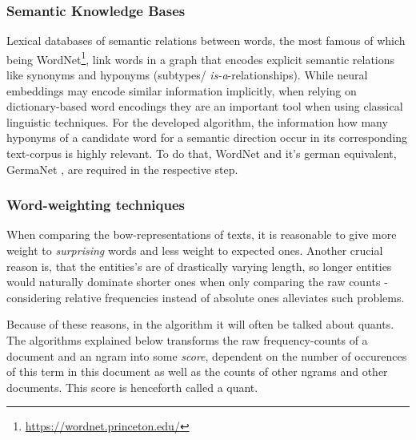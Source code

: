 \subsubsection*{Semantic Knowledge Bases}

Lexical databases of semantic relations between words, the most famous of which being WordNet\footnote{\url{https://wordnet.princeton.edu/}}, link words in a graph that encodes explicit semantic relations like synonyms and hyponyms (subtypes/ \emph{is-a}-relationships). While neural %
embeddings may encode similar information implicitly, when relying on dictionary-based word encodings they are an important tool when using classical linguistic techniques. For the developed algorithm, the information how many hyponyms of a candidate word for a semantic direction %
occur in its corresponding text-corpus is highly relevant. To do that, WordNet \cite{Miller1995} and it's german equivalent, GermaNet \cite{hamp-feldweg-1997-germanet,Henrich}, are required in the respective step.


\subsubsection*{Word-weighting techniques}

\label{sec:word_count_techniques}

When comparing the \gls{bow}-representations of texts, it is reasonable to give more weight to \emph{surprising} words and less weight to expected ones.  \cite[156]{Turney2010} 
Another crucial reason is, that the entities's are of drastically varying length, so longer entities would naturally dominate shorter ones when only comparing the raw counts - considering relative frequencies instead of absolute ones alleviates such problems.

Because of these reasons, in the algorithm it will often be talked about \glspl{quant}. The algorithms explained below transforms the raw frequency-counts of a document and an \gls{ngram} into some \emph{score}, dependent on the number of occurences of this term in this document as well as the counts of other \glspl{ngram} and other documents. This score is henceforth called a \gls{quant}.


\label{sec:embeddings}

